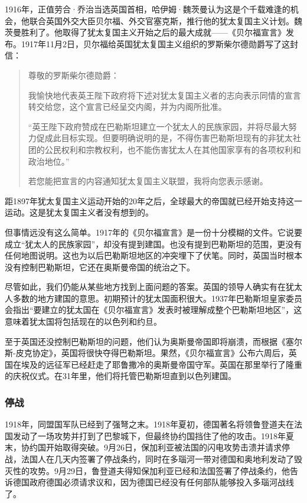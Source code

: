 \documentclass{article}
\begin{document}
1916年，正值劳合·乔治当选英国首相，哈伊姆·魏茨曼认为这是个千载难逢的机会，他联合英国外交大臣贝尔福、外交官塞克斯，推行他的犹太复国主义计划。魏茨曼胜利了。他取得了犹太复国主义开始之后的最大成就——《贝尔福宣言》发布。1917年11月2日，贝尔福给英国犹太复国主义组织的罗斯柴尔德勋爵写了这封信：
\begin{quote}
    尊敬的罗斯柴尔德勋爵：

    我愉快地代表英王陛下政府将下述对犹太复国主义者的志向表示同情的宣言转交给您，这个宣言已经呈交内阁，并为内阁所批准。

    “英王陛下政府赞成在巴勒斯坦建立一个犹太人的民族家园，并将尽最大努力促成此目标实现。但要明确说明的是，不得伤害巴勒斯坦现有的非犹太社团的公民权利和宗教权利，也不能伤害犹太人在其他国家享有的各项权利和政治地位。”

    若您能把宣言的内容通知犹太复国主义联盟，我将向您表示感谢。


\end{quote}

距1897年犹太复国主义运动开始的20年之后，全球最大的帝国就已经开始支持这一运动。这是犹太复国主义者没有想到的。

但事情远没有这么简单。1917年的《贝尔福宣言》是一份十分模糊的文件。它说要成立“犹太人的民族家园”，却没有提到建国。也没有提到巴勒斯坦的范围，更没有任何地图说明。这也为以后巴勒斯坦地区的冲突埋下了伏笔。同时，英国当时根本没有控制巴勒斯坦，它还在奥斯曼帝国的统治之下。

尽管如此，我们仍能从某些地方找到上面问题的答案。英国的领导人确实有在犹太人多数的地方建国的意思。初期预计的犹太国面积很大。1937年巴勒斯坦皇家委员会指出“要建立的犹太国在《贝尔福宣言》发表时被理解成整个巴勒斯坦地区”，这意味着犹太国将包括现在的以色列和约旦。

至于英国还没控制巴勒斯坦的问题，他们认为奥斯曼帝国即将崩溃，而根据《塞尔斯-皮克协定》，英国将很快夺得巴勒斯坦。果然，《贝尔福宣言》公布六周后，英国在埃及的远征军已经赶走了耶鲁撒冷的奥斯曼帝国守军。英国在那里举行了隆重的庆祝仪式。在31年里，他们将托管巴勒斯坦直到以色列建国。

\subsubsection{停战}
1918年，同盟国军队已经到了强弩之末。1918年夏初，德国著名将领鲁登道夫在法国发动了一场攻势并打到了巴黎城下，但最终协约国挡住了他的攻击。1918年夏末，协约国开始取得突破。9月26日，保加利亚被法国的闪电攻势击溃并请求停战，法国人在几天内签署了停战条约，同时在多瑙河一带对德国和奥地利发动了毁灭性的攻势。9月29日，鲁登道夫得知保加利亚已经和法国签署了停战条约，他告诉德国政府德国必须请求议和，因为德国已经没有任何部队能够投入多瑙河战线了。
\end{document}
